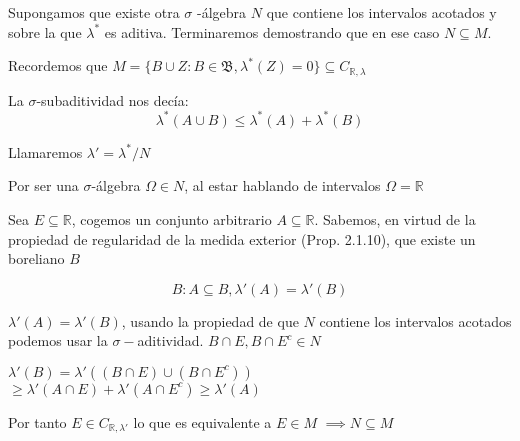 


Supongamos que existe otra $\sigma$ -\'algebra $N$ que contiene los intervalos acotados y sobre la que $\lambda ^*$ es aditiva. Terminaremos demostrando que en ese caso $N \subseteq M$.

Recordemos que $M=\{B \cup Z : B\in \mathfrak{B}, \lambda ^*(Z)=0\} \subseteq C_{\mathbb{R},\lambda }$

La $\sigma$-subaditividad nos decía:
\[\lambda ^*(A\cup B) \leq \lambda ^* (A)+ \lambda ^*(B)\]

Llamaremos $\lambda '=\lambda	^* / N$

Por ser una $\sigma$-\'algebra $\Omega \in N$, al estar hablando de intervalos $\Omega = \mathbb{R}$

Sea $E\subseteq \mathbb{R}$, cogemos un conjunto arbitrario $A\subseteq \mathbb{R}$.
Sabemos, en virtud de la propiedad de regularidad de la medida exterior (Prop. 2.1.10), que existe un boreliano $B$

\[ B:A\subseteq B, \lambda '(A)=\lambda '(B) \]

$\lambda '(A)=\lambda '(B)$,  usando la propiedad de que $N$ contiene los intervalos acotados podemos usar la $\sigma-$aditividad. 
$B\cap E, B\cap E^c \in N$ 

$\lambda '(B) = \lambda'\left( (B\cap E) \cup (B\cap E^c) \right) $
$\geqslant\lambda '(A\cap E) + \lambda'(A\cap E^c) \geqslant \lambda '(A)$

Por tanto $E \in C_{\mathbb{R},\lambda '}$ lo que es equivalente a $E \in M$
$\implies N \subseteq M$
 
